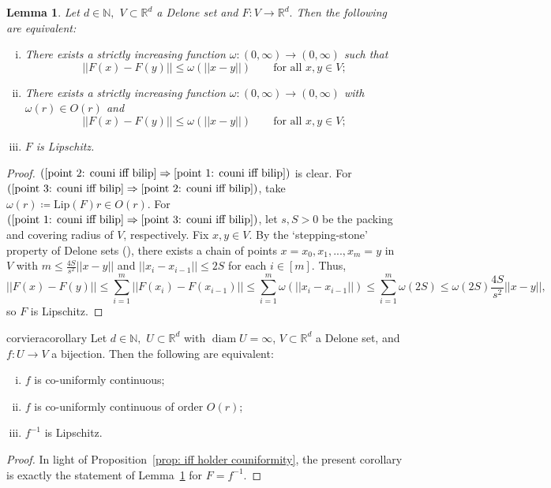 \documentclass{article}
\newtheorem{lemma}[define]{Lemma}
\newcommand{\R}{\mathbb{R}}
\newcommand{\N}{\mathbb{N}}
\DeclareMathOperator{\diam}{diam}
\begin{document}
\begin{lemma} \label{lemma: couni iff bilip}
    Let $d \in \N,$ $V\subset \R^d$ a Delone set and $F:V \to \R^d.$ Then the following are equivalent: 
    \begin{enumerate}[(i)]
        \item \label{point 1: couni iff bilip} There exists a strictly increasing function $\omega:(0,\infty) \to (0,\infty)$ such that
        $$||F(x)-F(y)|| \leq \omega(||x-y||) \qquad \text{for all $x,y \in V$};$$
        \item \label{point 2: couni iff bilip} There exists a strictly increasing function $\omega: (0,\infty) \to (0,\infty)$ with $\omega(r) \in O(r)$ and
        $$||F(x)-F(y)|| \leq \omega(||x-y||) \qquad \text{for all $x,y \in V$};$$
        \item  \label{point 3: couni iff bilip} $F$ is Lipschitz.
    \end{enumerate}
\end{lemma}
\begin{proof}
 $(\eqref{point 2: couni iff bilip} \Rightarrow \eqref{point 1: couni iff bilip})$ is clear.  For $(\eqref{point 3: couni iff bilip}\Rightarrow \eqref{point 2: couni iff bilip})$, take $\omega(r) \coloneqq \text{Lip}(F)r \in O(r).$
 For $(\eqref{point 1: couni iff bilip} \Rightarrow \eqref{point 3: couni iff bilip})$, let $s,S>0$ be the packing and covering radius of $V$, respectively. Fix $x,y \in V.$ By the `stepping-stone' property of Delone sets (\cite[Lemma $2.2$]{lagarias1999geometric}), there exists a chain of points $x = x_0,x_1,...,x_m = y$ in $V$ with $m \leq \frac{4S}{s^2}||x-y||$ and $||x_i-x_{i-1}||\leq 2S$ for each $i \in [m].$ Thus, 
    $$||F(x)-F(y)|| \leq \sum_{i = 1}^m ||F(x_i)-F(x_{i-1})|| \leq \sum_{i=1}^m \omega(||x_i - x_{i-1}||) \leq \sum_{i=1}^m \omega(2S) \leq \omega(2S)\frac{4S}{s^2}||x-y||,$$
 so $F$ is Lipschitz.
 \end{proof}
\begin{restatable}{cor}{vieracorollary} \label{viera corollary}
    \label{cor: couni iff bilip}
    Let $d \in \N,$ $U \subset \R^d$ with $\diam U = \infty$, $V\subset \R^d$ a Delone set, and $f:U \to V$ a bijection. Then the following are equivalent: 
    \begin{enumerate}[(i)]
        \item  \label{point 1: cor} $f$ is co-uniformly continuous;
        \item  \label{point 2: cor} $f$ is co-uniformly continuous of order $O(r)$;
        \item \label{point 3: cor} $f^{-1}$ is Lipschitz.
    \end{enumerate} 
\end{restatable}
   \begin{proof}
In light of Proposition~\ref{prop: iff holder couniformity}, the present corollary is exactly the statement of Lemma~\ref{lemma: couni iff bilip} for $F=f^{-1}$.
   \end{proof}
\end{document}
